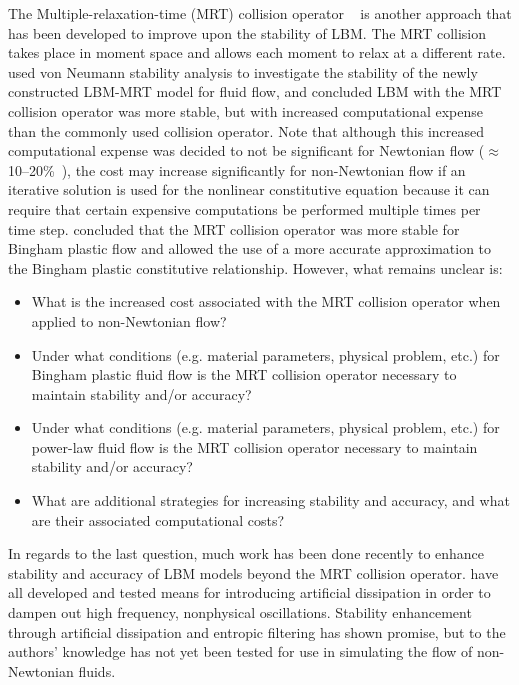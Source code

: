The Multiple-relaxation-time (MRT) collision operator ~\cite{d1994generalized} is another approach that has been developed to improve upon the stability of LBM.
The MRT collision takes place in moment space and allows each moment to relax at a different rate.
\cite{lallemand2000theory} used von Neumann stability analysis to investigate the stability of the newly constructed LBM-MRT model for fluid flow, and concluded LBM with the MRT collision operator was more stable, but with increased computational expense than the commonly used collision operator.
Note that although this increased computational expense was decided to not be significant for Newtonian flow ($\approx$ 10--20\%~\cite{lallemand2000theory}), the cost may increase significantly for non-Newtonian flow if an iterative solution is used for the nonlinear constitutive equation because it can require that certain expensive computations be performed multiple times per time step.
\cite{chen2014simulations} concluded that the MRT collision operator was more stable for Bingham plastic flow and allowed the use of a more accurate approximation to the Bingham plastic constitutive relationship.
However, what remains unclear is:
\begin{itemize}
    \item What is the increased cost associated with the MRT collision operator when applied to non-Newtonian flow?
    \item Under what conditions (e.g. material parameters, physical problem, etc.) for Bingham plastic fluid flow is the MRT collision operator necessary to maintain stability and/or accuracy?
    \item Under what conditions (e.g. material parameters, physical problem, etc.) for power-law fluid flow is the MRT collision operator necessary to maintain stability and/or accuracy?
    \item What are additional strategies for increasing stability and accuracy, and what are their associated computational costs?
\end{itemize}
In regards to the last question, much work has been done recently to enhance stability and accuracy of LBM models beyond the MRT collision operator.
\cite{brownlee2006stabilization,brownlee2007stability,brownlee2008nonequilibrium,packwood2009entropy,gorban2014enhancement} have all developed and tested means for introducing artificial dissipation in order to dampen out high frequency, nonphysical oscillations.
Stability enhancement through artificial dissipation and entropic filtering has shown promise, but to the authors' knowledge has not yet been tested for use in simulating the flow of non-Newtonian fluids.

